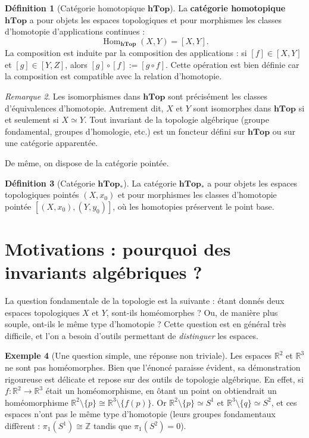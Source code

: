 \documentclass[12pt,a4paper,openany]{book}
\theoremstyle{definition}
\newtheorem{definition}{Définition}[chapter]
\newtheorem{exemple}[definition]{Exemple}
\theoremstyle{plain}
\theoremstyle{remark}
\newtheorem{remarque}[definition]{Remarque}
\newcommand{\Z}{\mathbb{Z}}
\newcommand{\R}{\mathbb{R}}
\DeclareMathOperator{\Hom}{Hom}
\begin{document}
\begin{definition}[Catégorie homotopique $\mathbf{hTop}$]\label{def:hTop}
La \textbf{catégorie homotopique} $\mathbf{hTop}$ a pour objets les espaces
topologiques et pour morphismes les classes d'homotopie d'applications continues :
\[
\Hom_{\mathbf{hTop}}(X, Y) = [X, Y].
\]
La composition est induite par la composition des applications : si
$[f] \in [X,Y]$ et $[g] \in [Y,Z]$, alors $[g] \circ [f] := [g \circ f]$.
Cette opération est bien définie car la composition est compatible avec la
relation d'homotopie.
\end{definition}

\begin{remarque}\label{rem:hTop-isomorphismes}
Les isomorphismes dans $\mathbf{hTop}$ sont précisément les classes
d'équivalences d'homotopie. Autrement dit, $X$ et $Y$ sont isomorphes dans
$\mathbf{hTop}$ si et seulement si $X \simeq Y$. Tout invariant de la
topologie algébrique (groupe fondamental, groupes d'homologie, etc.) est un
foncteur défini sur $\mathbf{hTop}$ ou sur une catégorie apparentée.
\end{remarque}

De même, on dispose de la catégorie pointée.

\begin{definition}[Catégorie $\mathbf{hTop}_*$]\label{def:hTopstar}
La catégorie $\mathbf{hTop}_*$ a pour objets les espaces topologiques pointés
$(X, x_0)$ et pour morphismes les classes d'homotopie pointée
$[(X,x_0),(Y,y_0)]$, où les homotopies préservent le point base.
\end{definition}

\section{Motivations : pourquoi des invariants algébriques ?}\label{sec:motivations}

La question fondamentale de la topologie est la suivante : étant donnés deux
espaces topologiques $X$ et $Y$, sont-ils homéomorphes ? Ou, de manière plus
souple, ont-ils le même type d'homotopie ? Cette question est en général très
difficile, et l'on a besoin d'outils permettant de \emph{distinguer} les espaces.

\begin{exemple}[Une question simple, une réponse non triviale]\label{ex:motivation-R2-R3}
Les espaces $\R^2$ et $\R^3$ ne sont pas homéomorphes. Bien que l'énoncé
paraisse évident, sa démonstration rigoureuse est délicate et repose sur des
outils de topologie algébrique. En effet, si $f : \R^2 \to \R^3$ était un
homéomorphisme, en ôtant un point on obtiendrait un homéomorphisme
$\R^2 \setminus \{p\} \cong \R^3 \setminus \{f(p)\}$. Or
$\R^2 \setminus \{p\} \simeq S^1$ et $\R^3 \setminus \{q\} \simeq S^2$, et ces
espaces n'ont pas le même type d'homotopie (leurs groupes fondamentaux diffèrent :
$\pi_1(S^1) \cong \Z$ tandis que $\pi_1(S^2) = 0$).
\end{exemple}
\end{document}
